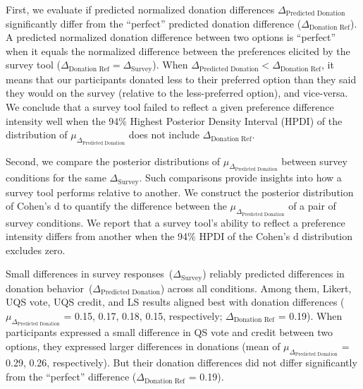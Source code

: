 First, we evaluate if predicted normalized donation differences $\Delta_{\text{Predicted Donation}}$ significantly differ from the ``perfect'' predicted donation difference ($\Delta_{\text{Donation Ref}}$). A predicted normalized donation difference between two options is ``perfect'' when it equals the normalized difference between the preferences elicited by the survey tool ($\Delta_{\text{Donation Ref}} = \Delta_{\text{Survey}}$). When $\Delta_{\text{Predicted Donation}} < \Delta_{\text{Donation Ref}}$, it means that our participants donated less to their preferred option than they said they would on the survey (relative to the less-preferred option), and vice-versa. We conclude that a survey tool failed to reflect a given preference difference intensity well when the 94\% Highest Posterior Density Interval (HPDI) of the distribution of $\mu_{\Delta_{\text{Predicted Donation}}}$ does not include $\Delta_{\text{Donation Ref}}$. 

Second, we compare the posterior distributions of $\mu_{\Delta_{\text{Predicted Donation}}}$ between survey conditions for the same $\Delta_{\text{Survey}}$. Such comparisons provide insights into how a survey tool performs relative to another. We construct the posterior distribution of Cohen's d to quantify the difference between the $\mu_{\Delta_{\text{Predicted Donation}}}$ of a pair of survey conditions. We report that a survey tool's ability to reflect a preference intensity differs from another when the 94\% HPDI of the Cohen's d distribution excludes zero. 

Small differences in survey responses~($\Delta_{\text{Survey}}$) reliably predicted differences in donation behavior~($\Delta_{\text{Predicted Donation}}$) across all conditions. Among them, Likert, UQS vote, UQS credit, and LS results aligned best with donation differences ($\mu_{\Delta_{\text{Predicted Donation}}}$ = 0.15, 0.17, 0.18, 0.15, respectively; $\Delta_{\text{Donation Ref}}$ = 0.19). When participants expressed a small difference in QS vote and credit between two options, they expressed larger differences in donations (mean of $\mu_{\Delta_{\text{Predicted Donation}}}$ = 0.29, 0.26, respectively). But their donation differences did not differ significantly from the ``perfect'' difference ($\Delta_{\text{Donation Ref}}$ = 0.19).

